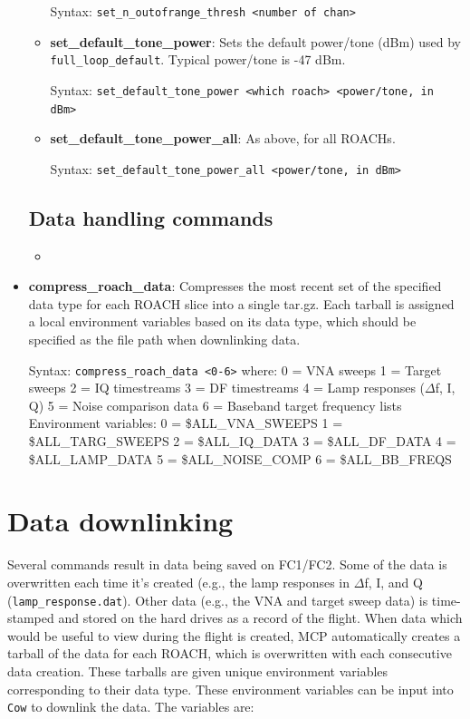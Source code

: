 \begin{itemize}[leftmargin=*,label={}]
\begin{itemize}[leftmargin=*,label={}]
Syntax: \texttt{set\_n\_outofrange\_thresh <number of chan>}

\item \textbf{set\_default\_tone\_power}: Sets the default power/tone (dBm) used by \texttt{full\_loop\_default}. Typical power/tone is -47 dBm.

Syntax: \texttt{set\_default\_tone\_power <which roach> <power/tone, in dBm>}

\item \textbf{set\_default\_tone\_power\_all}: As above, for all ROACHs.

Syntax: \texttt{set\_default\_tone\_power\_all <power/tone, in dBm>}

\end{itemize}

\subsection{Data handling commands}
\begin{itemize}[leftmargin=*,label={}]
  \item
\end{itemize}
\item \textbf{compress\_roach\_data}: Compresses the most recent set of the specified data type for each ROACH slice into a single tar.gz. Each tarball is assigned a local environment variables based on its data type, which should be specified as the file path when downlinking data.

Syntax: \texttt{compress\_roach\_data <0-6>}
where:
0 = VNA sweeps
1 = Target sweeps
2 = IQ timestreams
3 = DF timestreams
4 = Lamp responses ($\Delta$f, I, Q)
5 = Noise comparison data
6 = Baseband target frequency lists
Environment variables:
0 = \$ALL\_VNA\_SWEEPS
1 = \$ALL\_TARG\_SWEEPS
2 = \$ALL\_IQ\_DATA
3 = \$ALL\_DF\_DATA
4 = \$ALL\_LAMP\_DATA
5 = \$ALL\_NOISE\_COMP
6 = \$ALL\_BB\_FREQS

\end{itemize}

\section{Data downlinking}

Several commands result in data being saved on FC1/FC2. Some of the data is overwritten each time it’s created (e.g., the lamp responses in $\Delta$f, I, and Q (\texttt{lamp\_response.dat}). Other data (e.g., the VNA and target sweep data) is time-stamped and stored on the hard drives as a record of the flight. When data which would be useful to view during the flight is created, MCP automatically creates a tarball of the data for each ROACH, which is overwritten with each consecutive data creation. These tarballs are given unique environment variables corresponding to their data type. These environment variables can be input into \texttt{Cow} to downlink the data. The variables are:

